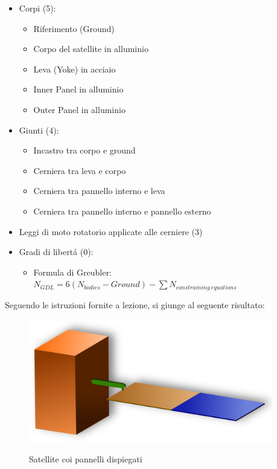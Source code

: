\documentclass{article}
\begin{document}
        \begin{itemize}
            \item Corpi (5):
            \begin{itemize}
                \item Riferimento (Ground) 
                \item Corpo del satellite in alluminio
                \item Leva (Yoke) in acciaio
                \item Inner Panel in alluminio
                \item Outer Panel in alluminio
            \end{itemize}
            \item Giunti (4):
            \begin{itemize}
                \item Incastro tra corpo e ground
                \item Cerniera tra leva e corpo
                \item Cerniera tra pannello interno e leva
                \item Cerniera tra pannello interno e pannello esterno
            \end{itemize}
            \item Leggi di moto rotatorio applicate alle cerniere (3)
            \item Gradi di libertá (0):
            \begin{itemize}
                \item Formula di Greubler: $N_{GDL} = 6(N_{bodies} - Ground) - \sum N_{constraining \ equations} $
            \end{itemize}
        \end{itemize}

        Seguendo le istruzioni fornite a lezione, si giunge al seguente risultato:

        \begin{figure}[h!]
            \centering 
             \label{satellite_dispiegato}
            \includegraphics[width=0.95\textwidth]{MUL2/Esercitazione4/satellite_dispiegato.eps}
            \caption{Satellite coi pannelli dispiegati}
        \end{figure}



                
        \clearpage
        \printbibliography
\end{document}
